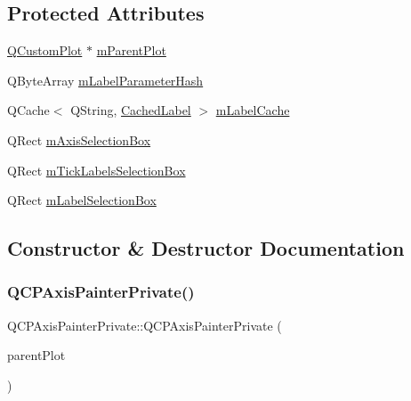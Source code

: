 \subsection*{Protected Attributes}
\begin{DoxyCompactItemize}
\item 
\hyperlink{class_q_custom_plot}{Q\+Custom\+Plot} $\ast$ \hyperlink{class_q_c_p_axis_painter_private_a882029a5f2d4abd71289d415c9b90a28}{m\+Parent\+Plot}
\item 
Q\+Byte\+Array \hyperlink{class_q_c_p_axis_painter_private_aab8be59df22ed4e43e3a6d511cbc466a}{m\+Label\+Parameter\+Hash}
\item 
Q\+Cache$<$ Q\+String, \hyperlink{struct_q_c_p_axis_painter_private_1_1_cached_label}{Cached\+Label} $>$ \hyperlink{class_q_c_p_axis_painter_private_a07ac270ea0c0ae084debd48d6a740e35}{m\+Label\+Cache}
\item 
Q\+Rect \hyperlink{class_q_c_p_axis_painter_private_a9d7586f4923994488bdd006415b13f5f}{m\+Axis\+Selection\+Box}
\item 
Q\+Rect \hyperlink{class_q_c_p_axis_painter_private_a0adaf5f1d89be0f32dc4a904d157e5a9}{m\+Tick\+Labels\+Selection\+Box}
\item 
Q\+Rect \hyperlink{class_q_c_p_axis_painter_private_abac9a47048d537f72ca147b6f29d30f1}{m\+Label\+Selection\+Box}
\end{DoxyCompactItemize}


\subsection{Constructor \& Destructor Documentation}
\mbox{\label{class_q_c_p_axis_painter_private_a0f14aa5c4aa83dbcd68984a7c73bf94f}} 
\subsubsection{\texorpdfstring{Q\+C\+P\+Axis\+Painter\+Private()}{QCPAxisPainterPrivate()}}
{\footnotesize\ttfamily Q\+C\+P\+Axis\+Painter\+Private\+::\+Q\+C\+P\+Axis\+Painter\+Private (\begin{DoxyParamCaption}\item[{\hyperlink{class_q_custom_plot}{Q\+Custom\+Plot} $\ast$}]{parent\+Plot }\end{DoxyParamCaption})\hspace{0.3cm}{\ttfamily [explicit]}}

